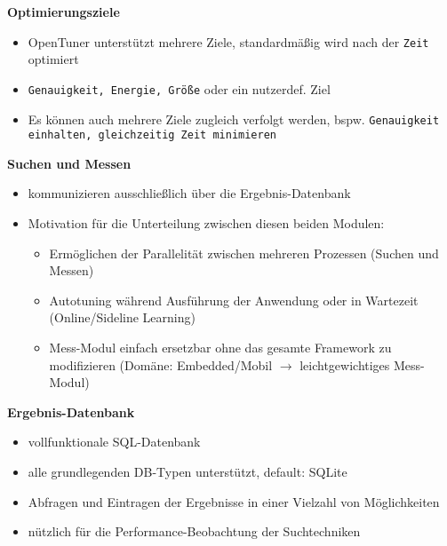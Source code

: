   \begin{frame}
  \textbf{Optimierungsziele}
    \begin{itemize}
      \item OpenTuner unterstützt mehrere Ziele, standardmäßig wird nach der \texttt{Zeit} optimiert
      \item \texttt{Genauigkeit, Energie, Größe} oder ein nutzerdef. Ziel
      \item Es können auch mehrere Ziele zugleich verfolgt werden, bspw. \texttt{Genauigkeit einhalten, gleichzeitig
      Zeit minimieren}
    \end{itemize}
    
    \textbf{Suchen und Messen}
    \begin{itemize}
      \item kommunizieren ausschließlich über die Ergebnis-Datenbank
      \item Motivation für die Unterteilung zwischen diesen beiden Modulen:
      \begin{itemize}
        \item Ermöglichen der Parallelität zwischen mehreren Prozessen (Suchen und Messen)
        \item Autotuning während Ausführung der Anwendung oder in Wartezeit (Online/Sideline Learning)
        \item Mess-Modul einfach ersetzbar ohne das gesamte Framework zu modifizieren (Domäne: Embedded/Mobil
        $\rightarrow$ leichtgewichtiges Mess-Modul)
      \end{itemize}
    \end{itemize}         
  \end{frame}
  
  \begin{frame}
  \textbf{Ergebnis-Datenbank}
    \begin{itemize}
      \item vollfunktionale SQL-Datenbank
      \item alle grundlegenden DB-Typen unterstützt, default: SQLite 
      \item Abfragen und Eintragen der Ergebnisse in einer Vielzahl von Möglichkeiten
      \item nützlich für die Performance-Beobachtung der Suchtechniken
    \end{itemize}
  \end{frame}
    

